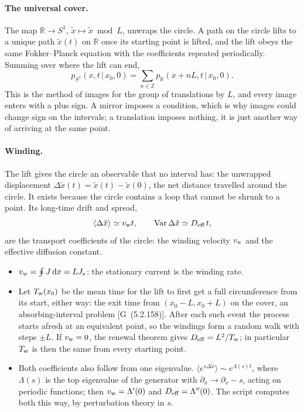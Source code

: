 \documentclass[11pt]{article}
\numberwithin{equation}{section}
\newcommand{\dd}{\mathrm{d}}
\newcommand{\avg}[1]{\langle #1\rangle}
\newcommand{\given}{\,|\,}
\newcommand{\G}[1]{[G~(#1)]}
\begin{document}
\paragraph{The universal cover.} The map $\mathbb R\to S^1$, $\tilde x\mapsto\tilde x\bmod L$, unwraps the
circle. A path on the circle lifts to a unique path $\tilde x(t)$ on $\mathbb R$ once its starting point is
lifted, and the lift obeys the same Fokker--Planck equation with the coefficients repeated periodically.
Summing over where the lift can end,
\begin{equation}
  p_{S^1}(x,t\given x_0,0)=\sum_{n\in\mathbb Z}p_{\mathbb R}(x+nL,t\given x_0,0).
  \label{eq:cover}
\end{equation}
This is the method of images for the group of translations by $L$, and every image enters with a plus sign.
A mirror imposes a condition, which is why images could change sign on the intervals; a translation imposes
nothing, it is just another way of arriving at the same point.

\paragraph{Winding.} The lift gives the circle an observable that no interval has: the unwrapped displacement
$\Delta\tilde x(t)=\tilde x(t)-\tilde x(0)$, the net distance travelled around the circle. It exists because
the circle contains a loop that cannot be shrunk to a point. Its long-time drift and spread,
\begin{equation}
  \avg{\Delta\tilde x}\simeq v_{\rm w}t,\qquad \operatorname{Var}\Delta\tilde x\simeq D_{\text{eff}}\,t,
  \label{eq:winding}
\end{equation}
are the transport coefficients of the circle: the winding velocity $v_{\rm w}$ and the effective diffusion
constant.
\begin{itemize}
  \item $v_{\rm w}=\oint J\,\dd x=LJ_s$: the stationary current is the winding rate.
  \item Let $T_{\rm w}(x_0)$ be the mean time for the lift to first get a full circumference from its start,
        either way: the exit time from $(x_0-L,x_0+L)$ on the cover, an absorbing-interval problem
        \G{5.2.158}. After each such event the process starts afresh at an equivalent point, so the windings
        form a random walk with steps $\pm L$. If $v_{\rm w}=0$, the renewal theorem gives $D_{\rm eff}=L^2/T_{\rm w}$;
        in particular $T_{\rm w}$ is then the same from every starting point.
  \item Both coefficients also follow from one eigenvalue. $\avg{e^{s\Delta\tilde x}}\sim e^{\Lambda(s)t}$,
        where $\Lambda(s)$ is the top eigenvalue of the generator with $\partial_x\to\partial_x-s$, acting on
        periodic functions; then $v_{\rm w}=\Lambda'(0)$ and $D_{\rm eff}=\Lambda''(0)$. The script computes both this
        way, by perturbation theory in $s$.
\end{itemize}
\end{document}
